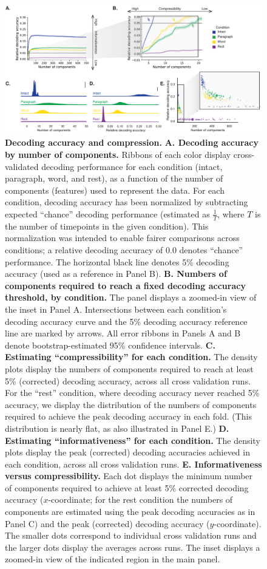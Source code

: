 \documentclass[english, 11pt]{article}
\begin{document}
\begin{figure}[tp]
  \centering
  
  \includegraphics[width=\textwidth]{figs/decoding_and_inflection}

\caption{\textbf{Decoding accuracy and compression.} \textbf{A. Decoding
accuracy by number of components.} Ribbons of each color display
cross-validated decoding performance for each condition (intact, paragraph,
word, and rest), as a function of the number of components (features) used to
represent the data. For each condition, decoding accuracy has been normalized
by subtracting expected ``chance'' decoding performance (estimated as
$\frac{1}{T}$, where $T$ is the number of timepoints in the given condition).
This normalization was intended to enable fairer comparisons across conditions;
a relative decoding accuracy of 0.0 denotes ``chance'' performance. The
horizontal black line denotes 5\% decoding accuracy (used as a reference in
Panel B). \textbf{B. Numbers of components required to reach a fixed decoding
accuracy threshold, by condition.} The panel displays a zoomed-in view of the
inset in Panel A. Intersections between each condition's decoding accuracy
curve and the 5\% decoding accuracy reference line are marked by arrows. All
error ribbons in Panels A and B denote bootstrap-estimated 95\% confidence
intervals. \textbf{C. Estimating ``compressibility'' for each condition.} The
density plots display the numbers of components required to reach at least 5\%
(corrected) decoding accuracy, across all cross validation runs. For the
``rest'' condition, where decoding accuracy never reached 5\% accuracy, we
display the distribution of the numbers of components required to achieve the
peak decoding accuracy in each fold. (This distribution is nearly flat, as
also illustrated in Panel E.) \textbf{D. Estimating ``informativeness'' for each
condition.} The density plots display the peak (corrected) decoding accuracies
achieved in each condition, across all cross validation runs. \textbf{E.
Informativeness versus compressibility.} Each dot displays the minimum number
of components required to achieve at least 5\% corrected decoding accuracy
($x$-coordinate; for the rest condition the numbers of components are estimated
using the peak decoding accuracies as in Panel C) and the peak (corrected)
decoding accuracy ($y$-coordinate). The smaller dots correspond to individual
cross validation runs and the larger dots display the averages across runs. The
inset displays a zoomed-in view of the indicated region in the main panel.}

\label{fig:inflection}
\end{figure}
\end{document}

